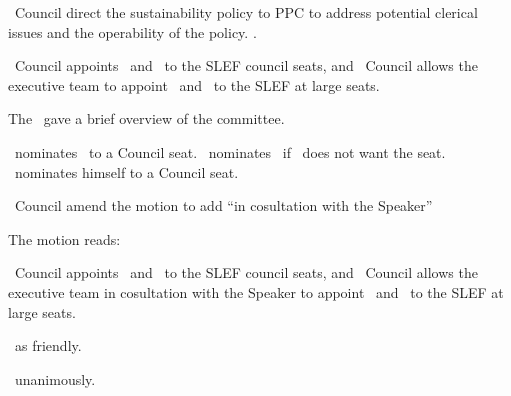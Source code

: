 \begin{motion}
    \birt\ Council direct the sustainability policy to PPC to address potential 
    clerical issues and the operability of the policy. 
    \movers{\seneca}{\rebecca}
    \carries.
\end{motion}

\begin{motion}
    \birt\ Council appoints \blank\ and \blank\ to the SLEF council seats, and
    \bifrt\ Council allows the executive team to appoint \blank\ and \blank\ to
    the SLEF at large seats.
    \movers{\jill}{\seneca}

    The \vpsl\ gave a brief overview of the committee. 

    \seneca\ nominates \stephanie\ to a Council seat. 
    \seneca\ nominates \elizebeth\ if \stephanie\ does not want the seat.
    \seneca\ nominates himself to a Council seat. 

    \begin{motion}
        \birt\ Council amend the motion to add ``in cosultation with the
        Speaker'' 

        The motion reads:
        \begin{motion}
            \birt\ Council appoints \blank\ and \blank\ to the SLEF council seats, and
            \bifrt\ Council allows the executive team in cosultation with the
            Speaker to appoint \blank\ and \blank\ to the SLEF at large seats.
        \end{motion}

        \carries\ as friendly.
    \end{motion}

    \carries\ unanimously.
\end{motion}


